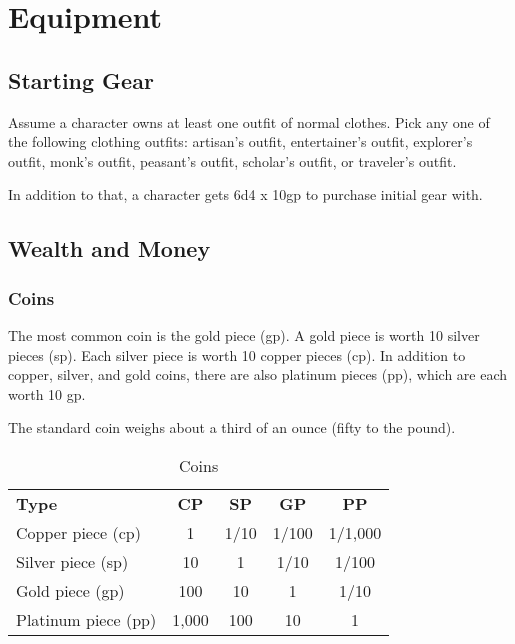 \chapter{Equipment}\label{chapter:Equipment}

\section{Starting Gear}

Assume a character owns at least one outfit of normal clothes. Pick any one of 
the following clothing outfits: artisan's outfit, entertainer's outfit, explorer's 
outfit, monk's outfit, peasant's outfit, scholar's outfit, or traveler's outfit.

In addition to that, a character gets 6d4 x 10gp to purchase initial gear with.

\section{Wealth and Money}

\subsection{Coins}

The most common coin is the gold piece (gp). A gold piece is worth 10 silver pieces (sp). 
Each silver piece is worth 10 copper pieces (cp). In addition to copper, silver, 
and gold coins, there are also platinum pieces (pp), which are each worth 10 gp.

The standard coin weighs about a third of an ounce (fifty to the pound).

\begin{table}[htb]
\caption{Coins}
\centering
\begin{tabular}{l c c c c}
\textbf{Type} & \textbf{CP} & \textbf{SP} & \textbf{GP} & \textbf{PP}\\
Copper piece (cp) & 1 & 1/10 & 1/100 & 1/1,000\\
Silver piece (sp) & 10 & 1 & 1/10 & 1/100\\
Gold piece (gp) & 100 & 10 & 1 & 1/10\\
Platinum piece (pp) & 1,000 & 100 & 10 & 1\\
\end{tabular}
\end{table}

